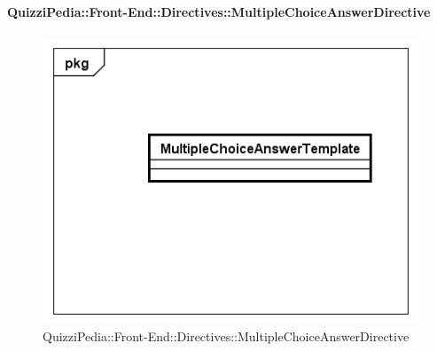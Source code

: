 		\paragraph{QuizziPedia::Front-End::Directives::MultipleChoiceAnswerDirective}
		
		\label{QuizziPedia::Front-End::Directives::MultipleChoiceAnswerDirective}
		
		\begin{figure}[ht]
			\centering
			\includegraphics[scale=0.5,keepaspectratio]{UML/Classi/Front-End/QuizziPedia_Front-end_Templates_MultipleChoiceAnswerTemplate.png}
			\caption{QuizziPedia::Front-End::Directives::MultipleChoiceAnswerDirective}
		\end{figure} \FloatBarrier
		
